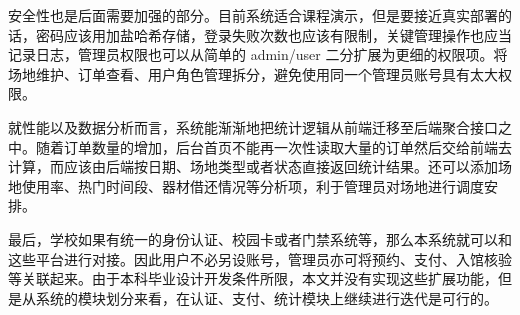 安全性也是后面需要加强的部分。目前系统适合课程演示，但是要接近真实部署的话，密码应该用加盐哈希存储，登录失败次数也应该有限制，关键管理操作也应当记录日志，管理员权限也可以从简单的 admin/user 二分扩展为更细的权限项。将场地维护、订单查看、用户角色管理拆分，避免使用同一个管理员账号具有太大权限。

就性能以及数据分析而言，系统能渐渐地把统计逻辑从前端迁移至后端聚合接口之中。随着订单数量的增加，后台首页不能再一次性读取大量的订单然后交给前端去计算，而应该由后端按日期、场地类型或者状态直接返回统计结果。还可以添加场地使用率、热门时间段、器材借还情况等分析项，利于管理员对场地进行调度安排。

最后，学校如果有统一的身份认证、校园卡或者门禁系统等，那么本系统就可以和这些平台进行对接。因此用户不必另设账号，管理员亦可将预约、支付、入馆核验等关联起来。由于本科毕业设计开发条件所限，本文并没有实现这些扩展功能，但是从系统的模块划分来看，在认证、支付、统计模块上继续进行迭代是可行的。
